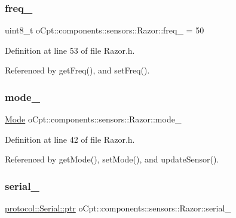 \subsubsection{\texorpdfstring{freq\+\_\+}{freq\_}}
{\footnotesize\ttfamily uint8\+\_\+t o\+Cpt\+::components\+::sensors\+::\+Razor\+::freq\+\_\+ = 50\hspace{0.3cm}{\ttfamily [private]}}



Definition at line 53 of file Razor.\+h.



Referenced by get\+Freq(), and set\+Freq().

\hypertarget{classo_cpt_1_1components_1_1sensors_1_1_razor_aa6610c4127d6fa300a5e2b5fa3eca461}{}\label{classo_cpt_1_1components_1_1sensors_1_1_razor_aa6610c4127d6fa300a5e2b5fa3eca461} 
\subsubsection{\texorpdfstring{mode\+\_\+}{mode\_}}
{\footnotesize\ttfamily \hyperlink{classo_cpt_1_1components_1_1sensors_1_1_razor_afed258e485aaaf9193a57d649ccb159b}{Mode} o\+Cpt\+::components\+::sensors\+::\+Razor\+::mode\+\_\+\hspace{0.3cm}{\ttfamily [private]}}



Definition at line 42 of file Razor.\+h.



Referenced by get\+Mode(), set\+Mode(), and update\+Sensor().

\hypertarget{classo_cpt_1_1components_1_1sensors_1_1_razor_af9d445b2a06bbe42bb965c0e42b711df}{}\label{classo_cpt_1_1components_1_1sensors_1_1_razor_af9d445b2a06bbe42bb965c0e42b711df} 
\subsubsection{\texorpdfstring{serial\+\_\+}{serial\_}}
{\footnotesize\ttfamily \hyperlink{classo_cpt_1_1protocol_1_1_serial_a4c97c6a2456d649974e07a186f634780}{protocol\+::\+Serial\+::ptr} o\+Cpt\+::components\+::sensors\+::\+Razor\+::serial\+\_\+\hspace{0.3cm}{\ttfamily [private]}}



